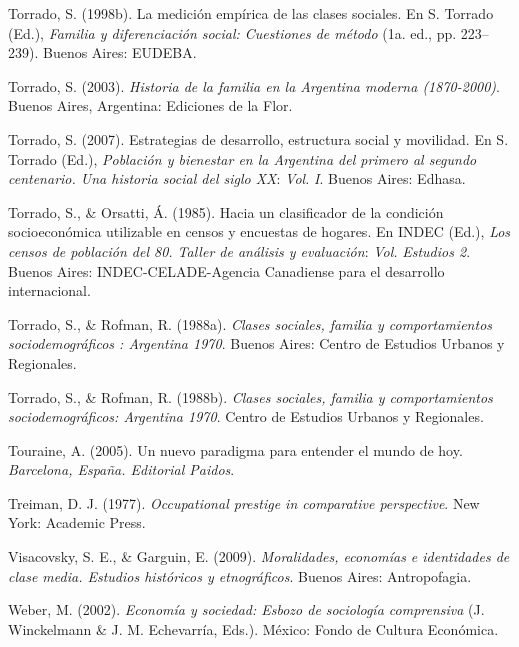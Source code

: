 \documentclass[
]{article}
\newlength{\cslhangindent}
\newlength{\cslentryspacingunit} %
\newenvironment{CSLReferences}[2] %
 {%
  \setlength{\parindent}{0pt}
  \ifodd #1
  \let\oldpar\par
  \def\par{\hangindent=\cslhangindent\oldpar}
  \fi
  \setlength{\parskip}{#2\cslentryspacingunit}
 }%
 {}
\begin{document}
\begin{CSLReferences}{1}{0}
\leavevmode{}%
Torrado, S. (1998b). La medición empírica de las clases sociales. En S. Torrado (Ed.), \emph{Familia y diferenciación social: Cuestiones de método} (1a. ed., pp. 223--239). Buenos Aires: EUDEBA.

\leavevmode{}%
Torrado, S. (2003). \emph{Historia de la familia en la {Argentina} moderna (1870-2000)}. Buenos Aires, Argentina: Ediciones de la Flor.

\leavevmode{}%
Torrado, S. (2007). Estrategias de desarrollo, estructura social y movilidad. En S. Torrado (Ed.), \emph{Población y bienestar en la {Argentina} del primero al segundo centenario. {Una} historia social del siglo {XX}}: \emph{Vol.} \emph{I}. Buenos Aires: Edhasa.

\leavevmode{}%
Torrado, S., \& Orsatti, Á. (1985). Hacia un clasificador de la condición socioeconómica utilizable en censos y encuestas de hogares. En INDEC (Ed.), \emph{Los censos de población del 80. {Taller} de análisis y evaluación}: \emph{Vol.} \emph{Estudios 2}. Buenos Aires: INDEC-CELADE-Agencia Canadiense para el desarrollo internacional.

\leavevmode{}%
Torrado, S., \& Rofman, R. (1988a). \emph{Clases sociales, familia y comportamientos sociodemográficos : {Argentina} 1970}. Buenos Aires: Centro de Estudios Urbanos y Regionales.

\leavevmode{}%
Torrado, S., \& Rofman, R. (1988b). \emph{Clases sociales, familia y comportamientos sociodemográficos: {Argentina} 1970}. Centro de Estudios Urbanos y Regionales.

\leavevmode{}%
Touraine, A. (2005). Un nuevo paradigma para entender el mundo de hoy. \emph{Barcelona, España. Editorial Paidos}.

\leavevmode{}%
Treiman, D. J. (1977). \emph{Occupational prestige in comparative perspective}. New York: Academic Press.

\leavevmode{}%
Visacovsky, S. E., \& Garguin, E. (2009). \emph{Moralidades, economías e identidades de clase media. {Estudios} históricos y etnográficos}. Buenos Aires: Antropofagia.

\leavevmode{}%
Weber, M. (2002). \emph{Economía y sociedad: Esbozo de sociología comprensiva} (J. Winckelmann \& J. M. Echevarría, Eds.). México: Fondo de Cultura Económica.


\end{CSLReferences}
\end{document}
